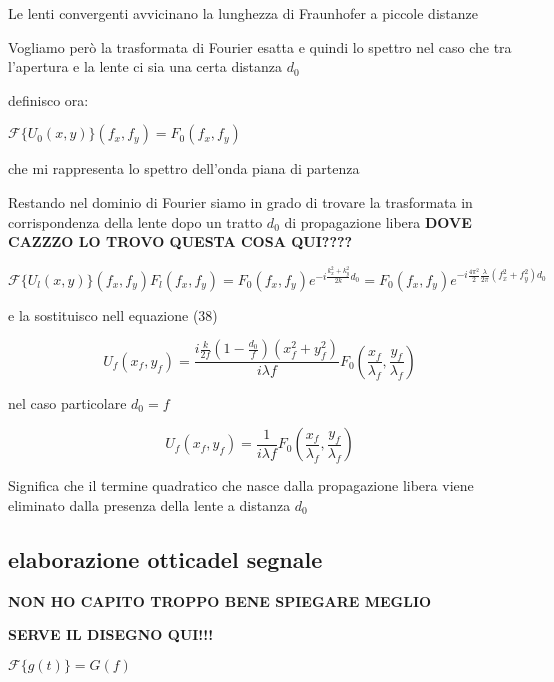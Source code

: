 \documentclass{article}
\begin{document}
Le lenti convergenti avvicinano la lunghezza di Fraunhofer a piccole distanze

Vogliamo però la trasformata di Fourier esatta  e quindi lo spettro nel caso che tra l'apertura e la lente ci sia una certa distanza $d_{0}$



definisco ora:

$\mathscr{F} \{	U_{0}(x,y)	\} ( f_{x}, f_{y})  = F_{0}(f_{x}, f_{y})$

che mi rappresenta lo spettro dell'onda piana di partenza

Restando nel dominio di Fourier siamo in grado di trovare la trasformata in corrispondenza della lente dopo un tratto $d_{0}$ di propagazione libera
\textbf{DOVE CAZZZO LO TROVO QUESTA COSA QUI????}

$	\mathscr{F} \{	U_{l}(x,y)	\} ( f_{x}, f_{y}) 	F_{l}(f_{x}, f_{y}) = F_{0}(f_{x}, f_{y}) 	e^{		-i \frac{  k_{x}^{2} +  k_{y}^{2}}{2 k}	d_{0}} = F_{0}(f_{x}, f_{y}) 	e^{		-i \frac{ 4 \pi ^{2}}{2}     \frac{\lambda}{ 2 \pi}    (  f_{x}^{2} +  f_{y}^{2})	d_{0}}$

e la sostituisco nell equazione (38) 

\begin{equation}
U_{f}(x_{f}, y_{f}) = \frac{       i \frac{k}{2 f} (     1- \frac{d_{0}}{f}  )(x_{f}^{2}+ y_{f}^{2})               }{i \lambda f} F_{0}(\frac{x_{f}}{\lambda_{f}}, \frac{y_{f}}{\lambda_{f}})
\end{equation}


nel caso particolare $d_{0}=f$

\begin{equation}
U_{f}(x_{f}, y_{f})=\frac{1}{ i \lambda f} F_{0}(\frac{x_{f}}{\lambda_{f}}, \frac{y_{f}}{\lambda_{f}})
\end{equation}

Significa che il termine quadratico che nasce dalla propagazione libera viene eliminato dalla presenza della lente a distanza $d_{0}$




\subsection{elaborazione otticadel segnale}

\textbf{NON HO CAPITO TROPPO BENE SPIEGARE MEGLIO}

\textbf{SERVE IL DISEGNO QUI!!!}



$\mathscr{F} \{ g(t)\}= G(f)$
\end{document}

